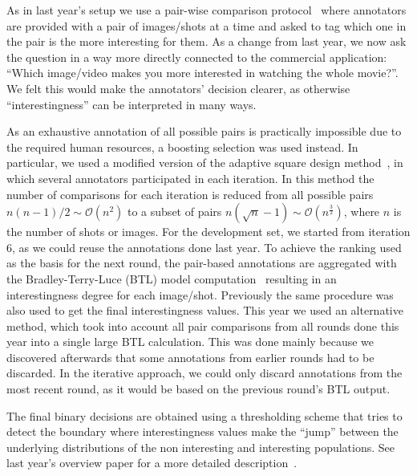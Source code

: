 \documentclass[sigconf]{acmart-me}
\begin{document}

As in last year's setup we use a pair-wise comparison protocol~\cite{Bradley} where annotators are provided with a pair of images/shots at a time and asked to tag which one in the pair is the more interesting for them.
As a change from last year, we now ask the question in a way more directly connected to the commercial application: ``Which image/video makes you more interested in watching the whole movie?''.
We felt this would make the annotators' decision clearer, as otherwise ``interestingness'' can be interpreted in many ways.


As an exhaustive annotation of all possible pairs is practically impossible due to the required human resources, a boosting selection was used instead.
In particular, we used a modified version of the adaptive square design method~\cite{Li-SPIE2013}, in which several annotators participated in each iteration.  
In this method the number of comparisons for each iteration is reduced from all possible pairs $n(n-1)/2 \sim \mathcal{O}(n^2)$ to a subset of pairs $n(\sqrt{n}-1) \sim \mathcal{O}(n^{\frac{3}{2}})$, where $n$ is the number of shots or images.
For the development set, we started from iteration 6, as we could reuse the annotations done last year.
To achieve the ranking used as the basis for the next round, the pair-based annotations are aggregated with the Bradley-Terry-Luce (BTL) model computation~\cite{Bradley} resulting in an interestingness degree for each image/shot.
Previously the same procedure was also used to get the final interestingness values.
This year we used an alternative method, which took into account all pair comparisons from all rounds done this year into a single large BTL calculation.
This was done mainly because we discovered afterwards that some annotations from earlier rounds had to be discarded. 
In the iterative approach, we could only discard annotations from the most recent round, as it would be based on the previous round's BTL output.


The final binary decisions are obtained using a thresholding scheme that tries to detect the boundary where interestingness values make the ``jump'' between the underlying distributions of the non interesting and interesting populations.  See last year's overview paper for a more detailed description~\cite{demarty2016mediaeval}.

  
\end{document}
